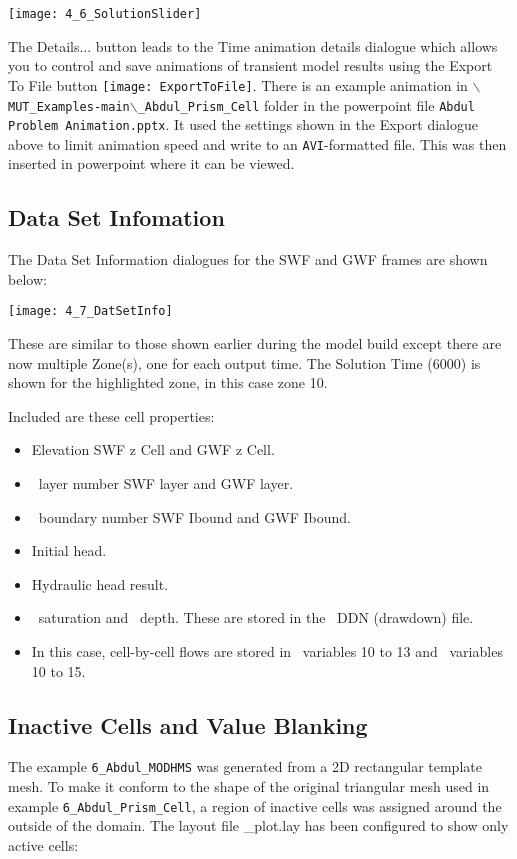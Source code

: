         \texttt{[image: 4\_6\_SolutionSlider]}

The {\sf Details...} button leads to the {\sf Time animation details} dialogue which allows you to control and save animations of transient model results using the {\sf Export To File} button \texttt{[image: ExportToFile]}.  There is an example animation in  \texttt{$\backslash$MUT\_Examples-main$\backslash$\_Abdul\_Prism\_Cell} folder in the powerpoint file {\tt Abdul Problem Animation.pptx}.  It used the settings shown in the {\sf Export} dialogue above to limit animation speed and write to an {\tt AVI}-formatted file.  This was then inserted in powerpoint where it can be viewed.

\subsection{Data Set Infomation}
The {\sf Data Set Information} dialogues for the {\sf SWF} and {\sf GWF} frames are shown below:

        \texttt{[image: 4\_7\_DatSetInfo]}

These are similar to those shown earlier during the model build except there are now multiple {\sf Zone(s)}, one for each output time.  The {\sf Solution Time} (6000) is shown for the highlighted zone, in this case zone 10.

Included are these cell properties:
\begin{itemize}
    \item Elevation {\sf SWF z Cell} and {\sf GWF z Cell}.
    \item \mf\ layer number  {\sf SWF layer} and {\sf GWF layer}.
    \item \mf\ boundary number {\sf SWF Ibound} and {\sf GWF Ibound}.
    \item Initial head.
    \item Hydraulic head result.
    \item \gwf\ saturation and \swf\ depth.  These are stored in the \mf\ DDN (drawdown) file.
    \item In this case, cell-by-cell flows are stored in \gwf\ variables 10 to 13 and \swf\ variables 10 to 15.
\end{itemize}

\subsection{Inactive Cells and Value Blanking }
The example {\tt 6\_Abdul\_MODHMS} was generated from a 2D rectangular template mesh.  To make it conform to the shape of the original triangular mesh used in example  {\tt 6\_Abdul\_Prism\_Cell}, a region of inactive cells was assigned around the outside of the domain.  The layout file {\sf \_plot.lay} has been configured to show only active cells:

